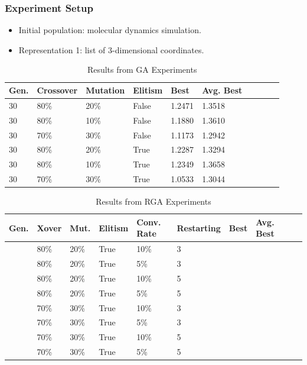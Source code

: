 \documentclass[10pt]{beamer}
\begin{document}
\begin{frame}
	\frametitle{Experiment Setup}

	\begin{itemize}
		\item Initial population: molecular dynamics simulation.
		\item Representation 1: list of 3-dimensional coordinates.
	\end{itemize}

\end{frame}

\begin{frame}

	\begin{table}
	  \caption{Results from GA Experiments}
	  \small
	  \begin{tabular}{ | l | l | l | l | l | l | l | l | l | l | }
	    \hline
	    Gen. & Crossover & Mutation & Elitism & Best & Avg. Best \\ \hline \hline
	    30 & 80\% & 20\% & False & 1.2471 & 1.3518 \\ \hline
	    30 & 80\% & 10\% & False & 1.1880 & 1.3610 \\ \hline
	    30 & 70\% & 30\% & False & 1.1173 & 1.2942 \\ \hline
	    
	    30 & 80\% & 20\% & True & 1.2287 & 1.3294 \\ \hline
	    30 & 80\% & 10\% & True & 1.2349 & 1.3658 \\ \hline
	    30 & 70\% & 30\% & True & 1.0533 & 1.3044 \\ \hline
	  \end{tabular}
	\end{table}

	\begin{table}
	  \caption{Results from RGA Experiments}
	  \small
	  \begin{tabular}{ | l | l | l | l | l | l | l | l | l | l | }
	    \hline
	    Gen. & Xover & Mut. & Elitism & Conv. Rate & Restarting & Best & Avg. Best \\ \hline \hline
	     & 80\% & 20\% & True & 10\% & 3 &  &  \\ \hline%
	     & 80\% & 20\% & True & 5\% & 3 &  &  \\ \hline%
	     & 80\% & 20\% & True & 10\% & 5 &  &  \\ \hline%
	     & 80\% & 20\% & True & 5\% & 5 &  &  \\ \hline%

	     & 70\% & 30\% & True & 10\% & 3 &  &  \\ \hline%
	     & 70\% & 30\% & True & 5\% & 3 &  &  \\ \hline%
	     & 70\% & 30\% & True & 10\% & 5 &  &  \\ \hline%
	     & 70\% & 30\% & True & 5\% & 5 &  &  \\ \hline%
	  \end{tabular}
	\end{table}

\end{frame}
\end{document}
